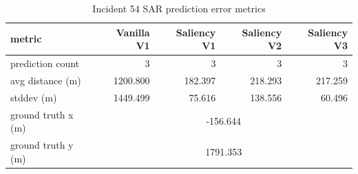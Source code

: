 \begin{table}[ht]
\centering
\caption{Incident 54 SAR prediction error metrics}
\label{tab:sar-incident-54}
\begin{tabular}{lrrrr}
\hline
metric & Vanilla V1 & Saliency V1 & Saliency V2 & Saliency V3 \\
\hline
prediction count & 3 & 3 & 3 & 3 \\
avg distance (m) & 1200.800 & 182.397 & 218.293 & 217.259 \\
stddev (m) & 1449.499 & 75.616 & 138.556 & 60.496 \\
ground truth x (m) & \multicolumn{4}{c}{-156.644} \\
ground truth y (m) & \multicolumn{4}{c}{1791.353} \\
\hline
\end{tabular}
\end{table}
